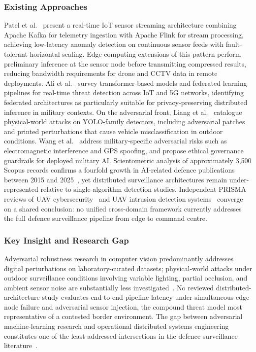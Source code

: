 \subsubsection{Existing Approaches}
Patel et al.~\cite{flink2024kafka} present a real-time IoT sensor streaming architecture combining Apache Kafka for telemetry ingestion with Apache Flink for stream processing, achieving low-latency anomaly detection on continuous sensor feeds with fault-tolerant horizontal scaling. Edge-computing extensions of this pattern perform preliminary inference at the sensor node before transmitting compressed results, reducing bandwidth requirements for drone and CCTV data in remote deployments. Ali et al.~\cite{threatdetect2024rt} survey transformer-based models and federated learning pipelines for real-time threat detection across IoT and 5G networks, identifying federated architectures as particularly suitable for privacy-preserving distributed inference in military contexts. On the adversarial front, Liang et al.~\cite{advyolo2022} catalogue physical-world attacks on YOLO-family detectors, including adversarial patches and printed perturbations that cause vehicle misclassification in outdoor conditions. Wang et al.~\cite{milai2025risk} address military-specific adversarial risks such as electromagnetic interference and GPS spoofing, and propose ethical governance guardrails for deployed military AI. Scientometric analysis of approximately 3{,}500 Scopus records confirms a fourfold growth in AI-related defence publications between 2015 and 2025~\cite{emerging2025scientometric}, yet distributed surveillance architectures remain under-represented relative to single-algorithm detection studies. Independent PRISMA reviews of UAV cybersecurity~\cite{uavsec2025iet} and UAV intrusion detection systems~\cite{uavids2025drones} converge on a shared conclusion: no unified cross-domain framework currently addresses the full defence surveillance pipeline from edge to command centre.

\subsubsection{Key Insight and Research Gap}
Adversarial robustness research in computer vision predominantly addresses digital perturbations on laboratory-curated datasets; physical-world attacks under outdoor surveillance conditions involving variable lighting, partial occlusion, and ambient sensor noise are substantially less investigated~\cite{advyolo2022}. No reviewed distributed-architecture study evaluates end-to-end pipeline latency under simultaneous edge-node failure and adversarial sensor injection, the compound threat model most representative of a contested border environment. The gap between adversarial machine-learning research and operational distributed systems engineering constitutes one of the least-addressed intersections in the defence surveillance literature~\cite{uavsec2025iet, milai2025risk}.


